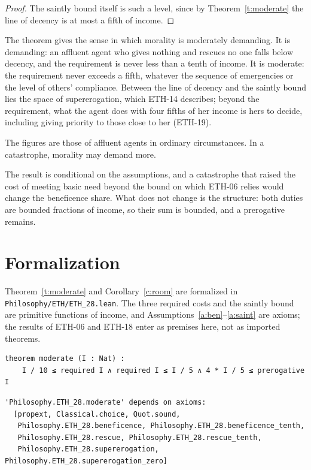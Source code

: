 \documentclass{situationist-preprint}
\begin{document}
\begin{proof}
The saintly bound itself is such a level, since by Theorem~\ref{t:moderate} the line of decency is at most a fifth of income.
\end{proof}

The theorem gives the sense in which morality is moderately demanding. It is demanding: an affluent agent who gives nothing and rescues no one falls below decency, and the requirement is never less than a tenth of income. It is moderate: the requirement never exceeds a fifth, whatever the sequence of emergencies or the level of others' compliance. Between the line of decency and the saintly bound lies the space of supererogation, which ETH-14 describes; beyond the requirement, what the agent does with four fifths of her income is hers to decide, including giving priority to those close to her (ETH-19).

\begin{objection}
The figures are those of affluent agents in ordinary circumstances. In a catastrophe, morality may demand more.
\end{objection}

\begin{reply}
The result is conditional on the assumptions, and a catastrophe that raised the cost of meeting basic need beyond the bound on which ETH-06 relies would change the beneficence share. What does not change is the structure: both duties are bounded fractions of income, so their sum is bounded, and a prerogative remains.
\end{reply}

\section{Formalization}

Theorem~\ref{t:moderate} and Corollary~\ref{c:room} are formalized in \nolinkurl{Philosophy/ETH/ETH_28.lean}. The three required costs and the saintly bound are primitive functions of income, and Assumptions~\ref{a:ben}--\ref{a:saint} are axioms; the results of ETH-06 and ETH-18 enter as premises here, not as imported theorems.

\begin{lstlisting}
theorem moderate (I : Nat) :
    I / 10 ≤ required I ∧ required I ≤ I / 5 ∧ 4 * I / 5 ≤ prerogative I
\end{lstlisting}

\begin{lstlisting}
'Philosophy.ETH_28.moderate' depends on axioms:
  [propext, Classical.choice, Quot.sound,
   Philosophy.ETH_28.beneficence, Philosophy.ETH_28.beneficence_tenth,
   Philosophy.ETH_28.rescue, Philosophy.ETH_28.rescue_tenth,
   Philosophy.ETH_28.supererogation, Philosophy.ETH_28.supererogation_zero]
\end{lstlisting}
\end{document}

